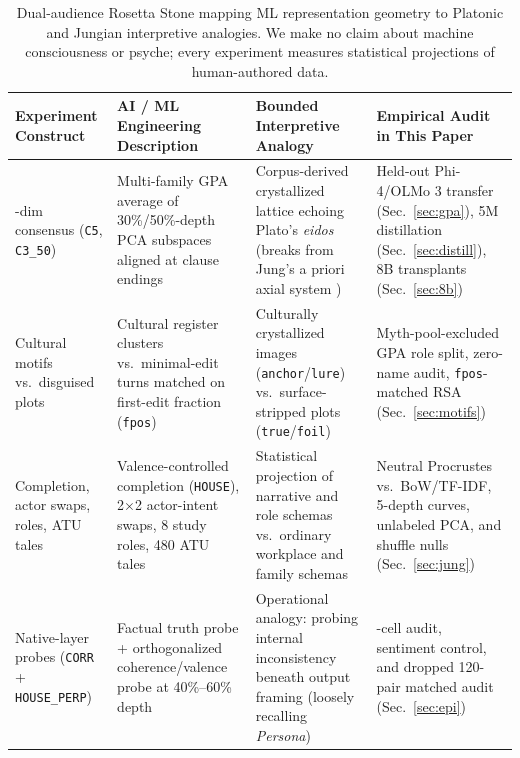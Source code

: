 \documentclass[conference]{IEEEtran}
\begin{document}
\begin{table}[t]
\centering
\caption{Dual-audience Rosetta Stone mapping ML representation geometry to Platonic and Jungian interpretive analogies. We make no claim about machine consciousness or psyche; every experiment measures statistical projections of human-authored data.}
\label{tab:rosetta}
\footnotesize
\setlength{\tabcolsep}{4pt}
\begin{tabular}{@{} >{\raggedright\arraybackslash}p{3.0cm} >{\raggedright\arraybackslash}p{4.9cm} >{\raggedright\arraybackslash}p{4.6cm} >{\raggedright\arraybackslash}p{4.4cm} @{}}
\toprule
\textbf{Experiment Construct} & \textbf{AI / ML Engineering Description} & \textbf{Bounded Interpretive Analogy} & \textbf{Empirical Audit in This Paper} \\
\midrule
256-dim consensus (\texttt{C5}, \texttt{C3\_50}) & Multi-family GPA average of 30\%/50\%-depth PCA subspaces aligned at clause endings \cite{gower1975gpa,cheng2026platoskey} & Corpus-derived crystallized lattice echoing Plato's \textit{eidos} (breaks from Jung's a priori axial system \cite{plato1892dialogues,jung1968archetypes}) & Held-out Phi-4/OLMo 3 transfer (Sec.~\ref{sec:gpa}), 5M distillation (Sec.~\ref{sec:distill}), 8B transplants (Sec.~\ref{sec:8b}) \\
\addlinespace[2pt]
Cultural motifs vs.\ disguised plots & Cultural register clusters vs.\ minimal-edit turns matched on first-edit fraction (\texttt{fpos}) & Culturally crystallized images (\texttt{anchor}/\texttt{lure}) vs.\ surface-stripped plots (\texttt{true}/\texttt{foil}) \cite{roesler2012archetypes} & Myth-pool-excluded GPA role split, zero-name audit, \texttt{fpos}-matched RSA (Sec.~\ref{sec:motifs}) \\
\addlinespace[2pt]
Completion, actor swaps, roles, ATU tales & Valence-controlled completion (\texttt{HOUSE}), 2$\times$2 actor-intent swaps, 8 study roles, 480 ATU tales \cite{uther2004types,hagedorn2022bearing} & Statistical projection of narrative and role schemas vs.\ ordinary workplace and family schemas & Neutral Procrustes vs.\ BoW/TF-IDF, 5-depth curves, unlabeled PCA, and shuffle nulls (Sec.~\ref{sec:jung}) \\
\addlinespace[2pt]
Native-layer probes (\texttt{CORR} + \texttt{HOUSE\_PERP}) & Factual truth probe \cite{marks2024geometry} + orthogonalized coherence/valence probe at 40\%--60\% depth & Operational analogy: probing internal inconsistency beneath output framing (loosely recalling \textit{Persona}) & 12-cell audit, sentiment control, and dropped 120-pair matched audit (Sec.~\ref{sec:epi}) \\
\bottomrule
\end{tabular}
\end{table}
\end{document}
